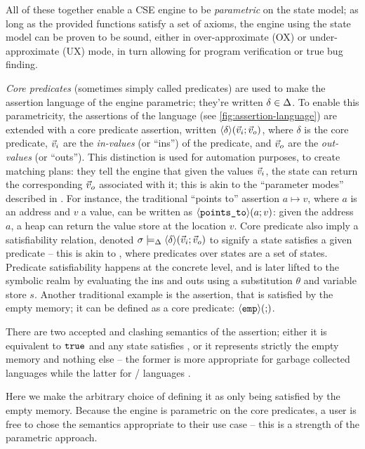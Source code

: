 All of these together enable a CSE engine to be \emph{parametric} on the state model; as long as the provided functions satisfy a set of axioms, the engine using the state model can be proven to be sound, either in over-approximate (OX) or under-approximate (UX) mode, in turn allowing for program verification or true bug finding.

\emph{Core predicates} (sometimes simply called predicates) are used to make the assertion language of the engine parametric; they're written ${\delta\in\Delta}$. To enable this parametricity, the assertions of the language (see \autoref{fig:assertion-language}) are extended with a core predicate assertion, written $\left<\delta\right>\!(\vec{v}_i;\vec{v}_o)$, where $\delta$ is the core predicate, $\vec{v}_i$ are the \emph{in-values} (or ``ins'') of the predicate, and $\vec{v}_o$ are the \emph{out-values} (or ``outs''). This distinction is used for automation purposes, to create matching plans: they tell the engine that given the values $\vec{v}_i$, the state can return the corresponding $\vec{v}_o$ associated with it; this is akin to the ``parameter modes'' described in \cite{parametermodes}. For instance, the traditional ``points to'' assertion $a \mapsto v$, where $a$ is an address and $v$ a value, can be written as $\left<\texttt{points\_to}\right>\!(a;v)$: given the address $a$, a heap can return the value store at the location $v$. Core predicate also imply a satisfiability relation, denoted $\sigma\models_{\Delta}\left<\delta\right>\!(\vec{v}_i;\vec{v}_o)$ to signify a state satisfies a given predicate -- this is akin to \cite{abstractseplogic,localreasoning}, where predicates over states are a set of states. Predicate satisfiability happens at the concrete level, and is later lifted to the symbolic realm by evaluating the ins and outs using a substitution $\theta$ and variable store $s$. Another traditional example is the \emp{} assertion, that is satisfied by the empty memory; it can be defined as a core predicate: $\left<\texttt{emp}\right>\!(;\!)$.

\begin{remark}
There are two accepted and clashing semantics of the \emp{} assertion; either it is equivalent to $\texttt{true}$ and any state satisfies \emp{}, or it represents strictly the empty memory and nothing else -- the former is more appropriate for garbage collected languages while the latter for \alloc/\free{} languages \cite{sljungle}.

Here we make the arbitrary choice of defining it as only being satisfied by the empty memory. Because the engine is parametric on the core predicates, a user is free to chose the semantics appropriate to their use case -- this is a strength of the parametric approach.
\end{remark}

